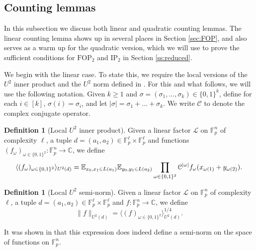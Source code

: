 \documentclass[12pt,oneside,british,a4wide]{amsart}
\numberwithin{equation}{section}
\theoremstyle{definition}
\newtheorem{definition}[theorem]{Definition}
\def\E{\mathbb{E}}
\def\C{\mathbb{C}}
\def\F{\mathbb{F}}
\def\FOP{\mathrm{FOP}}
\def\IP{\mathrm{IP}}
\def\ra{\rightarrow}
\newcommand{\calL}{\mathcal{L}}
\newcommand{\calC}{\mathcal{C}}
\begin{document}
\subsection{Counting lemmas}\label{ss:counting} In this subsection we discuss both linear and quadratic counting lemmas.   The linear counting lemma  shows up in several places in Section \ref{sec:FOP}, and also serves as a warm up for the quadratic version, which we will use to prove the sufficient conditions for $\FOP_2$ and $\IP_2$ in Section \ref{ss:reduced}.

We begin with the linear case.  To state this, we require the local versions of the $U^2$ inner product and the $U^2$ norm defined in \cite{Terry.2021d}.  For this and what follows, we will use the following notation. Given $k\geq 1$ and $\sigma=(\sigma_1,\ldots, \sigma_k)\in \{0,1\}^k$, define for each $i\in [k]$,  $\sigma(i)=\sigma_i$,  and let $|\sigma|=\sigma_1+\ldots+\sigma_k$.  We write $\calC$ to denote the complex conjugate operator.

\begin{definition}[Local $U^2$ inner product]\label{def:localinner}
Given a linear factor $\calL$ on $\F_p^n$ of complexity $\ell$, a tuple $d=(a_1,a_2)\in \mathbb{F}_p^{\ell}\times \mathbb{F}_p^{\ell}$ and functions $(f_{\omega})_{\omega\in \{0,1\}^2}:\F_p^n\ra \C$, we define
\[\langle (f_{\omega})_{\omega\in \{0,1\}^2}\rangle_{U^2(d)}=\E_{\begin{subarray}{l} x_0,x_1\in L(a_1)\end{subarray}}\E_{\begin{subarray}{l}y_0,y_1\in L(a_2)\end{subarray}}\prod_{\omega\in \{0,1\}^2}\calC^{|\omega|}f_{\omega}(x_{\omega(1)}+y_{\omega(2)}).\]
\end{definition}

\begin{definition}[Local $U^2$ semi-norm]\label{def:localu2}
Given a linear factor $\calL$ on $\F_p^n$ of complexity $\ell$, a tuple $d=(a_1,a_2)\in \mathbb{F}_p^{\ell}\times \mathbb{F}_p^{\ell}$ and $f:\F_p^n\ra\C$, we define
\[\|f\|_{U^2(d)}= \langle (f)_{\omega\in \{0,1\}^2}\rangle_{U^2(d)}^{1/4}.\]
\end{definition}

It was shown in \cite[Lemma 3.4]{Terry.2021d} that this expression does indeed define a semi-norm on the space of functions on $\F_p^n$.  
\end{document}
